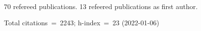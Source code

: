 70 refereed publications. 13 refeered publications as first author.

Total citations~=~2243; h-index~=~23 (2022-01-06)